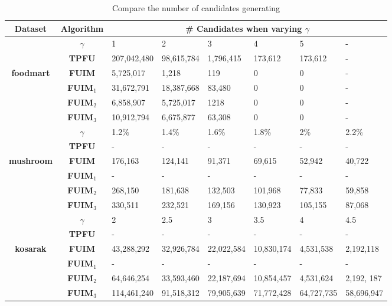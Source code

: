 \documentclass[journal]{IEEEtran}
\begin{document}
\begin{table*}[htbp]
	\normalsize
	\centering
	\caption{Compare the number of candidates generating}
	\label{tab:compare_candidates}
	
	\begin{tabular}{|c|c|llllll|}
		\hline\hline
		\textbf{Dataset} & \textbf{Algorithm} & \multicolumn{6}{c|}{\textbf{\# Candidates when varying $\gamma$}} \\ \hline
		
		&$\gamma$	   & 1\textperthousand & 2\textperthousand & 3\textperthousand & 4\textperthousand & 5\textperthousand & - \\ \cline{2-8}
		&\textbf{TPFU} 		    & 207,042,480 & 98,615,784 & 1,796,415 & 173,612 & 173,612 & -\\
		\textbf{foodmart} &\textbf{FUIM}  		  & 5,725,017 & 1,218 & 119 & 0 & 0 & -\\
		&\textbf{FUIM$_1$}  & 31,672,791 & 18,387,668  & 83,480 & 0 & 0 & -\\
		&\textbf{FUIM$_2$}  & 6,858,907 & 5,725,017 & 1218 & 0 & 0 &- \\
		&\textbf{FUIM$_3$}  & 10,912,794 & 6,675,877 & 63,308 & 0 & 0 &- \\ \hline
		
		& $\gamma$	   & 1.2\% & 1.4\% & 1.6\% & 1.8\% & 2\% & 2.2\% \\ \cline{2-8}
		&\textbf{TPFU} 		    & - & - & - & - & - & - \\
		\textbf{mushroom} &\textbf{FUIM}  		   & 176,163 & 124,141 & 91,371 & 69,615 & 52,942 & 40,722 \\
		&\textbf{FUIM$_{1}$}  & - & - & - & - & - & -  \\
		&\textbf{FUIM$_{2}$}  & 268,150 & 181,638 & 132,503 & 101,968 & 77,833 & 59,858  \\
		&\textbf{FUIM$_{3}$}  & 330,511 & 232,521 & 169,156 & 130,923 & 105,155 & 87,068 \\ \hline
		
		& $\gamma$	    & 2\textperthousand & 2.5\textperthousand & 3\textperthousand & 3.5\textperthousand & 4\textperthousand & 4.5\textperthousand \\ \cline{2-8}
		&\textbf{TPFU} 		   & - & - & - & - & - & - \\
		\textbf{kosarak} &\textbf{FUIM}  		  & 43,288,292 & 32,926,784 & 22,022,584 & 10,830,174 & 4,531,538 & 2,192,118 \\
		&\textbf{FUIM$_{1}$}  & - & - & - & - & - & -  \\
		&\textbf{FUIM$_{2}$}  & 64,646,254 & 33,593,460 & 22,187,694 & 10,854,457 & 4,531,624 & 2,192, 187  \\
		&\textbf{FUIM$_{3}$}  & 114,461,240 & 91,518,312 & 79,905,639 & 71,772,428 & 64,727,735 & 58,696,947 \\ \hline
		

\end{tabular}
\end{table*}
\end{document}
